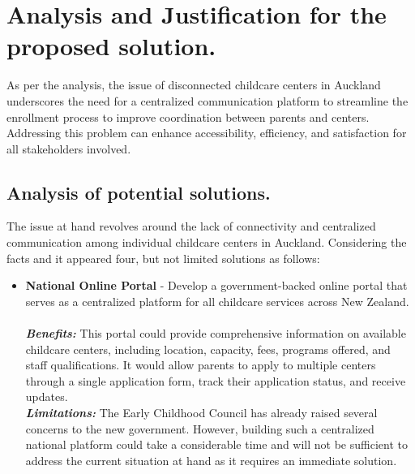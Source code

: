 \section{Analysis and Justification for the proposed solution.}
As per the analysis, the issue of disconnected childcare centers in Auckland underscores the need for a centralized communication platform to streamline the enrollment process to improve coordination between parents and centers. Addressing this problem can enhance accessibility, efficiency, and satisfaction for all stakeholders involved.

\subsection{Analysis of potential solutions.}
The issue at hand revolves around the lack of connectivity and centralized communication among individual childcare centers in Auckland. Considering the facts and it appeared four, but not limited solutions as follows: 

\begin{itemize}
    \item \textbf{National Online Portal} - Develop a government-backed online portal that serves as a centralized platform for all childcare services across New Zealand.\\ \\
    \emph{\textbf{Benefits:}} This portal could provide comprehensive information on available childcare centers, including location, capacity, fees, programs offered, and staff qualifications. It would allow parents to apply to multiple centers through a single application form, track their application status, and receive updates. \\
    \emph{\textbf{Limitations:}} The Early Childhood Council has already raised several concerns to the new government. \cite{daycareshortage} However, building such a centralized national platform could take a considerable time and will not be sufficient to address the current situation at hand as it requires an immediate solution.
\end{itemize}